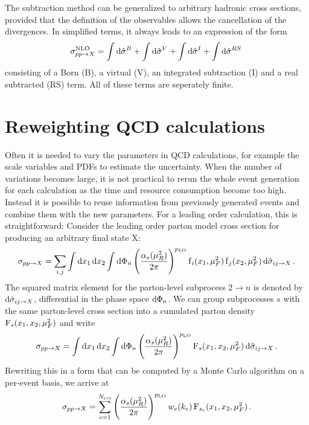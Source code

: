 The subtraction method can be generalized to arbitrary hadronic cross sections, provided that the definition of the observables allows the cancellation of the divergences.
In simplified terms, it always leads to an expression of the form
%
\begin{equation}
	\sigma^\text{NLO}_{pp \rightarrow X} = \int \dif \hat \sigma^B + \int \dif \hat \sigma^V + \int \dif \hat \sigma^I + \int \dif \hat \sigma^{RS} \,
\end{equation}
%
consisting of a Born (B), a virtual (V), an integrated subtraction (I) and a real subtracted (RS) term.
All of these terms are seperately finite.
%
\section{Reweighting QCD calculations}
Often it is needed to vary the parameters in QCD calculations, for example the scale variables and PDFs to estimate the uncertainty.
When the number of variations becomes large, it is not practical to rerun the whole event generation for each calculation as the time and resource consumption become too high.
Instead it is possible to reuse information from previously generated events and combine them with the new parameters.
For a leading order calculation, this is straightforward:
Consider the leading order parton model cross section for producing an arbitrary final state X:
%
\begin{equation}
	\sigma_{pp \rightarrow X} = \sum_{i,j} \int \dif x_1 \dif x_2 \int \dif \Phi_n \left( \frac{\alpha_s(\mu_R^2)}{2 \pi} \right)^{p_\text{LO}} \pdf_i(x_1,\mu_F^2) \pdf_j(x_2,\mu_F^2) \dif \hat\sigma_{ij \rightarrow X} \, .
\end{equation}
%
The squared matrix element for the parton-level subprocess $2 \rightarrow n$ is denoted by $\dif \hat\sigma_{ij \rightarrow X}$, differential in the phase space $\dif \Phi_n$.
We can group subprocesses $s$ with the same parton-level cross section into a cumulated parton density $\operatorname{F}_s(x_1,x_2,\mu_F^2)$ and write 
%
\begin{equation}
	\sigma_{pp \rightarrow X} = \int \dif x_1 \dif x_2 \int \dif \Phi_n \left( \frac{\alpha_s(\mu_R^2)}{2 \pi} \right)^{p_\text{LO}} \subpdf_s(x_1,x_2,\mu_F^2) \dif \hat\sigma_{ij \rightarrow X} \, .
\end{equation}
%
Rewriting this in a form that can be computed by a Monte Carlo algorithm on a per-event basis, we arrive at
%
\begin{equation}
  \sigma_{pp \rightarrow X} = \sum_{e=1}^{N_\text{evt}} \left( \frac{\alpha_s(\mu_R^2)}{2 \pi} \right)^{p_\text{LO}} w_e(k_e) \operatorname{F}_{s_e}(x_1,x_2,\mu_F^2) \, .
  \label{eq:reweight_lo}
\end{equation}
